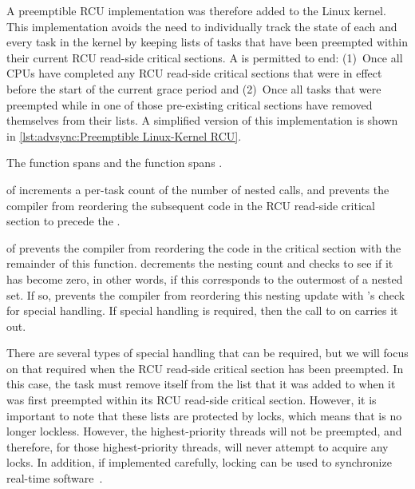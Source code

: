 A preemptible RCU implementation was therefore added to the Linux kernel.
This implementation avoids the need to individually track the state of
each and every task in the kernel by keeping lists of tasks that have
been preempted within their current RCU read-side critical sections.
A  is permitted to end: (1)~Once all CPUs have completed any
RCU read-side critical sections that were in effect before the start
of the current grace period and
(2)~Once all tasks that were preempted
while in one of those pre-existing critical sections have removed
themselves from their lists.
A simplified version of this implementation is shown in
\cref{lst:advsync:Preemptible Linux-Kernel RCU}.
\begin{fcvref}
The  function spans  and
the  function spans .
\end{fcvref}

\begin{fcvref}
 of  increments a per-task count of the
number of nested  calls, and
 prevents the compiler from reordering the subsequent code in the
RCU read-side critical section to precede the .
\end{fcvref}

\begin{fcvref}
 of  prevents the compiler from
reordering the code in the critical section with the remainder of
this function.
 decrements the nesting count and checks to see if it
has become zero, in other words, if this corresponds to the outermost
 of a nested set.
If so,  prevents the compiler from reordering this nesting
update with 's check for special handling.
If special handling is required, then the call to
 on  carries it out.

There are several types of special handling that can be required, but
we will focus on that required when the RCU read-side critical section
has been preempted.
In this case, the task must remove itself from the list that it was
added to when it was first preempted within its
RCU read-side critical section.
However, it is important to note that these lists are protected by locks,
which means that  is no longer lockless.
However, the highest-priority threads will not be preempted, and therefore,
for those highest-priority threads,  will never
attempt to acquire any locks.
In addition, if implemented carefully, locking can be used to synchronize
real-time software~\cite{BjoernBrandenburgPhD,DipankarSarma2004OLSscalability}.
\end{fcvref}

